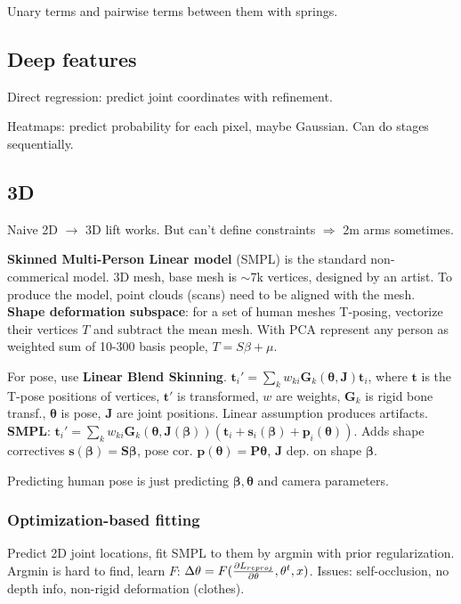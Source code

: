 \documentclass[11pt,landscape,a4paper,fleqn]{article}
\def\myvector#1{\mathbf{#1}}
\def\vp{{\myvector{p}}}
\def\vs{{\myvector{s}}}
\def\vt{{\myvector{t}}}
\def\mymatrix#1{\mathbf{#1}}
\def\mG{{\mymatrix{G}}}
\def\mJ{{\mymatrix{J}}}
\def\mP{{\mymatrix{P}}}
\def\mS{{\mymatrix{S}}}
\begin{document}
\begin{multicols*}{4}
Unary terms and pairwise terms between them with springs.

\subsection{Deep features}

Direct regression: predict joint coordinates with refinement.

Heatmaps: predict probability for each pixel, maybe Gaussian.
Can do stages sequentially.

\subsection{3D}

Naive 2D $\to$ 3D lift works.
But can't define constraints $ \Rightarrow $ 2m arms sometimes.

\textbf{Skinned Multi-Person Linear model} (SMPL) is the standard non-commerical model.
3D mesh, base mesh is $\sim$7k vertices, designed by an artist.
To produce the model, point clouds (scans) need to be aligned with the mesh.
\textbf{Shape deformation subspace}: for a set of human meshes T-posing,
vectorize their vertices $T$ and subtract the mean mesh.
With PCA represent any person as weighted sum of 10-300 basis people, $T = S\beta + \mu$.

For pose, use \textbf{Linear Blend Skinning}.
$\vt_i' = \sum_k w_{ki} \mG_k(\bm\theta, \mJ)\vt_i$,
where $\vt$ is the T-pose positions of vertices,
$\vt'$ is transformed, $w$ are weights,
$\mG_k$ is rigid bone transf.,
$\bm\theta$ is pose, $\mJ$ are joint positions.
Linear assumption produces artifacts.
\textbf{SMPL}:
$\vt_i' = \sum_k w_{ki} \mG_k(\bm\theta, \mJ(\bm\beta))(\vt_i + \vs_i(\bm\beta) + \vp_i(\bm\theta))$.
Adds shape correctives $\vs(\bm\beta) = \mS\bm\beta$,
pose cor. $\vp(\bm\theta) = \mP\bm\theta$,
$\mJ$ dep. on shape $\bm\beta$.

Predicting human pose is just predicting $\bm\beta, \bm\theta$ and camera parameters.

\subsubsection{Optimization-based fitting} Predict 2D joint locations,
fit SMPL to them by argmin with prior regularization.
Argmin is hard to find, learn $F$: $\Delta \theta = F(\pdv{L_{reproj}}{\theta}, \theta^t, x)$.
Issues: self-occlusion, no depth info, non-rigid deformation (clothes).


\end{multicols*}
\end{document}

